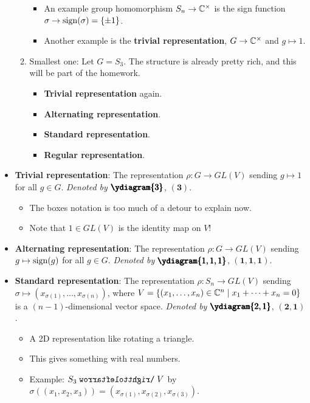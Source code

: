 \documentclass[../notes.tex]{subfiles}
\begin{document}
\begin{itemize}
\begin{enumerate}
        \begin{itemize}
            \item An example group homomorphism $S_n\to\mathbb{C}^\times$ is the sign function $\sigma\to\operatorname{sign}(\sigma)=\{\pm 1\}$.
            \item Another example is the \textbf{trivial representation}, $G\to\mathbb{C}^\times$ and $g\mapsto 1$.
        \end{itemize}
        \item Smallest one: Let $G=S_3$. The structure is already pretty rich, and this will be part of the homework.
        \begin{itemize}
            \item \textbf{Trivial representation} again.
            \item \textbf{Alternating representation}.
            \item \textbf{Standard representation}.
            \item \textbf{Regular representation}.
        \end{itemize}
    \end{enumerate}
    \item \textbf{Trivial representation}: The representation $\rho:G\to GL(V)$ sending $g\mapsto 1$ for all $g\in G$. \emph{Denoted by} $\pmb{\ydiagram{3}}$, $\bm{(3)}$.
    \begin{itemize}
        \item The boxes notation is too much of a detour to explain now.
        \item Note that $1\in GL(V)$ is the identity map on $V$!
    \end{itemize}
    \item \textbf{Alternating representation}: The representation $\rho:G\to GL(V)$ sending $g\mapsto\operatorname{sign}(g)$ for all $g\in G$. \emph{Denoted by} $\pmb{\ydiagram{1,1,1}}$, $\bm{(1,1,1)}$.
    \item \textbf{Standard representation}: The representation $\rho:S_n\to GL(V)$ sending $\sigma\mapsto(x_{\sigma(1)},\dots,x_{\sigma(n)})$, where $V=\{(x_1,\dots,x_n)\in\mathbb{C}^n\mid x_1+\cdots+x_n=0\}$ is a $(n-1)$-dimensional vector space. \emph{Denoted by} $\pmb{\ydiagram{2,1}}$, $\bm{(2,1)}$.
    \begin{itemize}
        \item A 2D representation like rotating a triangle.
        \item This gives something with real numbers.
        \item Example: $S_3\acts V$ by $\sigma((x_1,x_2,x_3))=(x_{\sigma(1)},x_{\sigma(2)},x_{\sigma(3)})$.

\end{itemize}
\end{itemize}
\end{document}
